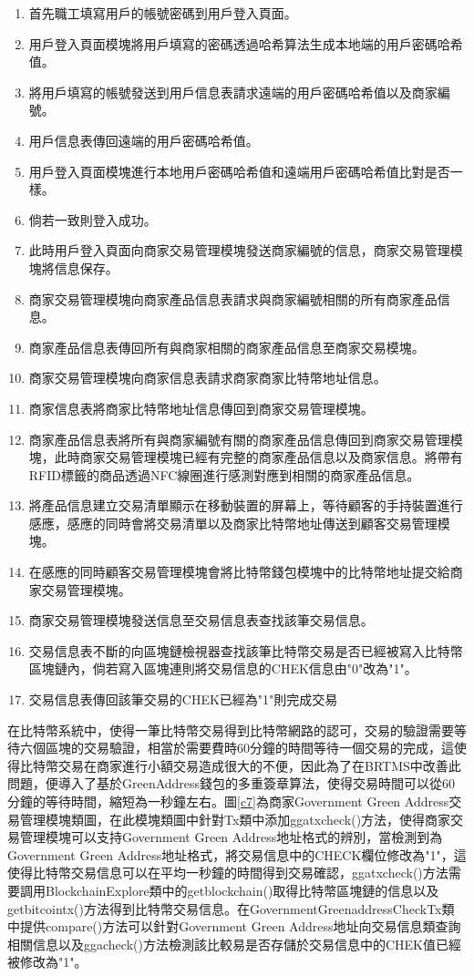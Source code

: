 	\begin{enumerate}
	\item 首先職工填寫用戶的帳號密碼到用戶登入頁面。
	\item 用戶登入頁面模塊將用戶填寫的密碼透過哈希算法生成本地端的用戶密碼哈希值。
	\item 將用戶填寫的帳號發送到用戶信息表請求遠端的用戶密碼哈希值以及商家編號。
	\item 用戶信息表傳回遠端的用戶密碼哈希值。
	\item 用戶登入頁面模塊進行本地用戶密碼哈希值和遠端用戶密碼哈希值比對是否一樣。
	\item 倘若一致則登入成功。
	\item 此時用戶登入頁面向商家交易管理模塊發送商家編號的信息，商家交易管理模塊將信息保存。
	\item 商家交易管理模塊向商家產品信息表請求與商家編號相關的所有商家產品信息。
	\item 商家產品信息表傳回所有與商家相關的商家產品信息至商家交易模塊。
	\item 商家交易管理模塊向商家信息表請求商家商家比特幣地址信息。
	\item 商家信息表將商家比特幣地址信息傳回到商家交易管理模塊。
	\item 商家產品信息表將所有與商家編號有關的商家產品信息傳回到商家交易管理模塊，此時商家交易管理模塊已經有完整的商家產品信息以及商家信息。將帶有RFID標籤的商品透過NFC線圈進行感測對應到相關的商家產品信息。
	\item 將產品信息建立交易清單顯示在移動裝置的屏幕上，等待顧客的手持裝置進行感應，感應的同時會將交易清單以及商家比特幣地址傳送到顧客交易管理模塊。

	\item 在感應的同時顧客交易管理模塊會將比特幣錢包模塊中的比特幣地址提交給商家交易管理模塊。
	\item 商家交易管理模塊發送信息至交易信息表查找該筆交易信息。
	\item 交易信息表不斷的向區塊鏈檢視器查找該筆比特幣交易是否已經被寫入比特幣區塊鏈內，倘若寫入區塊連則將交易信息的CHEK信息由"0"改為"1"。
	\item 交易信息表傳回該筆交易的CHEK已經為"1"則完成交易
	
	\end{enumerate}

	在比特幣系統中，使得一筆比特幣交易得到比特幣網路的認可，交易的驗證需要等待六個區塊的交易驗證，相當於需要費時60分鐘的時間等待一個交易的完成，這使得比特幣交易在商家進行小額交易造成很大的不便，因此為了在BRTMS中改善此問題，便導入了基於GreenAddress錢包的多重簽章算法，使得交易時間可以從60分鐘的等待時間，縮短為一秒鐘左右。圖\ref{c7}為商家Government Green Address交易管理模塊類圖，在此模塊類圖中針對Tx類中添加ggatxcheck()方法，使得商家交易管理模塊可以支持Government Green Address地址格式的辨別，當檢測到為Government Green Address地址格式，將交易信息中的CHECK欄位修改為"1"，這使得比特幣交易信息可以在平均一秒鐘的時間得到交易確認，ggatxcheck()方法需要調用BlockchainExplore類中的getblockchain()取得比特幣區塊鏈的信息以及getbitcointx()方法得到比特幣交易信息。在GovernmentGreenaddressCheckTx類中提供compare()方法可以針對Government Green Address地址向交易信息類查詢相關信息以及ggacheck()方法檢測該比較易是否存儲於交易信息中的CHEK值已經被修改為"1"。

